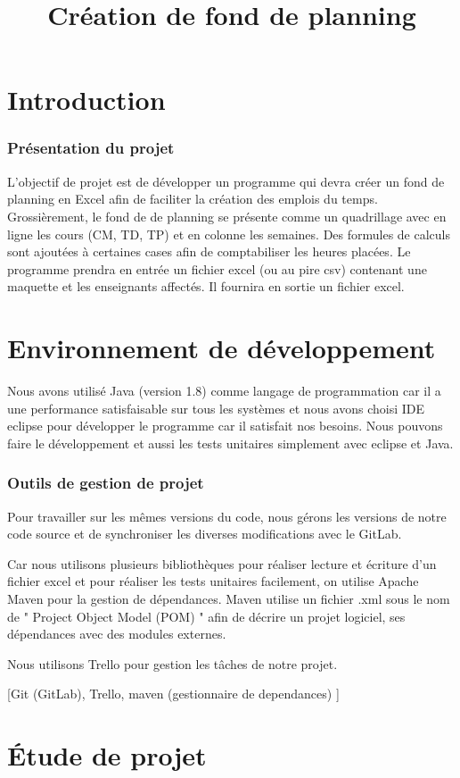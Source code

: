 \documentclass{polytech/polytech}
\title{Création de fond de planning}
\begin{document}
	\part{Introduction}
	\section{Présentation du projet}
	L’objectif de projet est de développer un programme qui devra créer un fond de planning en Excel afin de faciliter la création des emplois du temps. Grossièrement, le fond de de planning se présente comme un quadrillage avec en ligne les cours (CM, TD, TP) et en colonne les semaines. Des formules de calculs sont ajoutées à certaines cases afin de comptabiliser les heures placées. Le programme prendra en entrée un fichier excel (ou au pire csv) contenant une maquette et les enseignants affectés. Il fournira en sortie un fichier excel.
	\part{Environnement de développement}
	Nous avons utilisé Java (version 1.8) comme langage de programmation car il a une performance satisfaisable sur tous les systèmes et nous avons choisi IDE eclipse pour développer le programme car il satisfait nos besoins. Nous pouvons faire le développement et aussi les tests unitaires simplement avec eclipse et Java.

	\section{Outils de gestion de projet}
	Pour travailler sur les mêmes versions du code, nous gérons les versions de notre code source et de synchroniser les diverses modifications avec le GitLab.
	
	Car nous utilisons plusieurs bibliothèques pour réaliser lecture et écriture d'un fichier excel et pour réaliser les tests unitaires facilement, on utilise Apache Maven pour la gestion de dépendances. Maven utilise un fichier .xml sous le nom de " Project Object Model (POM) " afin de décrire un projet logiciel, ses dépendances avec des modules externes.

	Nous utilisons Trello pour gestion les tâches de notre projet.

	[Git (GitLab), Trello, maven (gestionnaire de dependances) ]

	\part{Étude de projet}
\end{document}
